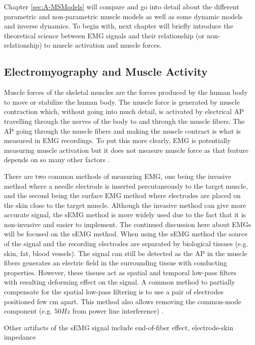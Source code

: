 Chapter \ref{sec:A-MSModels} will compare and go into detail about the different parametric and non-parametric muscle models as well as some dynamic models and inverse dynamics.
To begin with, next chapter will briefly introduce the theoretical science between \ac{EMG} signals and their relationship (or non-relationship) to muscle activation and muscle forces.

\subsection{Electromyography and Muscle Activity}
\label{sec:A-EMG}
Muscle forces of the skeletal muscles are the forces produced by the human body to move or stabilize the human body. 
The muscle force is generated by muscle contraction which, without going into much detail, is activated by electrical \ac{AP} travelling through the nerves of the body to and through the muscle fibers. 
The \ac{AP} going through the muscle fibers and making the muscle contract is what is measured in \ac{EMG} recordings.
To put this more clearly, \ac{EMG} is potentially measuring muscle activation but it does not measure muscle force as that feature depends on so many other factors \cite{Enoka2016}.

There are two common methods of measuring EMG, one being the invasive method where a needle electrode is inserted percutaneously to the target muscle, and the second being the surface EMG method where electrodes are placed on the skin close to the target muscle. 
Although the invasive method can give more accurate signal, the \ac{sEMG} method is more widely used due to the fact that it is non-invasive and easier to implement. 
The continued discussion here about \ac{EMG}s will be focused on the \ac{sEMG} method.
When using the \ac{sEMG} method the source of the signal and the recording electrodes are separated by biological tissues (e.g. skin, fat, blood vessels).
The signal can still be detected as the \ac{AP} in the muscle fibers generates an electric field in the surrounding tissue with conducting properties.
However, these tissues act as spatial and temporal low-pass filters with resulting deforming effect on the signal.
A common method to partially compensate for the spatial low-pass filtering is to use a pair of electrodes positioned few cm apart.
This method also allows removing the common-mode component (e.g. $50Hz$ from power line interference) \cite{Farina2016}.

Other artifacts of the \ac{sEMG} signal include end-of-fiber effect, electrode-skin impedance

